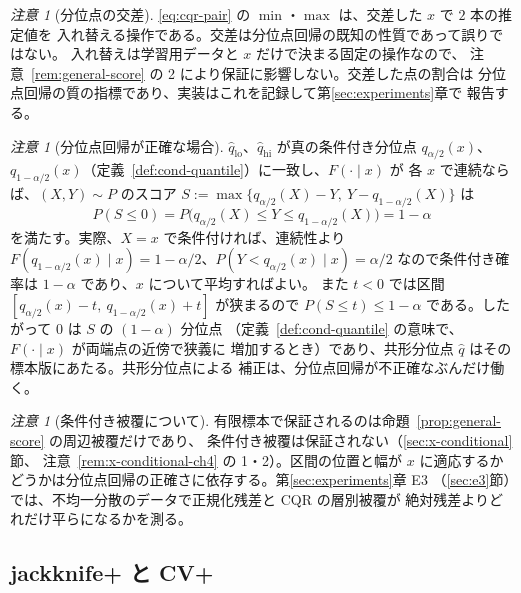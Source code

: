 \documentclass[a4paper,11pt]{jsarticle}
\theoremstyle{definition}
\theoremstyle{plain}
\theoremstyle{remark}
\newtheorem{remark}[definition]{注意}
\newcommand{\qhat}{\hat{q}}
\begin{document}
\begin{remark}[分位点の交差]
  \label{rem:cqr-crossing}
  \eqref{eq:cqr-pair} の $\min$・$\max$ は、交差した $x$ で $2$ 本の推定値を
  入れ替える操作である。交差は分位点回帰の既知の性質であって誤りではない。
  入れ替えは学習用データと $x$ だけで決まる固定の操作なので、
  注意~\ref{rem:general-score} の 2 により保証に影響しない。交差した点の割合は
  分位点回帰の質の指標であり、実装はこれを記録して第\ref{sec:experiments}章で
  報告する。
\end{remark}

\begin{remark}[分位点回帰が正確な場合]
  \label{rem:cqr-oracle}
  $\qhat_{\mathrm{lo}}$、$\qhat_{\mathrm{hi}}$ が真の条件付き分位点 $q_{\alpha/2}(x)$、
  $q_{1-\alpha/2}(x)$（定義~\ref{def:cond-quantile}）に一致し、$F(\cdot\mid x)$ が
  各 $x$ で連続ならば、$(X,Y)\sim P$ のスコア
  $S:=\max\{q_{\alpha/2}(X)-Y,\ Y-q_{1-\alpha/2}(X)\}$ は
  \begin{equation*}
    P(S\le0)=P\bigl(q_{\alpha/2}(X)\le Y\le q_{1-\alpha/2}(X)\bigr)=1-\alpha
  \end{equation*}
  を満たす。実際、$X=x$ で条件付ければ、連続性より
  $F(q_{1-\alpha/2}(x)\mid x)=1-\alpha/2$、$P(Y<q_{\alpha/2}(x)\mid x)=\alpha/2$
  なので条件付き確率は $1-\alpha$ であり、$x$ について平均すればよい。
  また $t<0$ では区間 $[q_{\alpha/2}(x)-t,\ q_{1-\alpha/2}(x)+t]$ が狭まるので
  $P(S\le t)\le1-\alpha$ である。したがって $0$ は $S$ の $(1-\alpha)$ 分位点
  （定義~\ref{def:cond-quantile} の意味で、$F(\cdot\mid x)$ が両端点の近傍で狭義に
  増加するとき）であり、共形分位点 $\qhat$ はその標本版にあたる。共形分位点による
  補正は、分位点回帰が不正確なぶんだけ働く。
\end{remark}

\begin{remark}[条件付き被覆について]
  \label{rem:cqr-asymptotic}
  有限標本で保証されるのは命題~\ref{prop:general-score} の周辺被覆だけであり、
  条件付き被覆は保証されない（\ref{sec:x-conditional}節、
  注意~\ref{rem:x-conditional-ch4} の 1・2）。区間の位置と幅が $x$ に適応するか
  どうかは分位点回帰の正確さに依存する。第\ref{sec:experiments}章 E3
  （\ref{sec:e3}節）では、不均一分散のデータで正規化残差と CQR の層別被覆が
  絶対残差よりどれだけ平らになるかを測る。
\end{remark}

\subsection{jackknife+ と CV+}
\label{sec:jackknife-plus}
\end{document}

